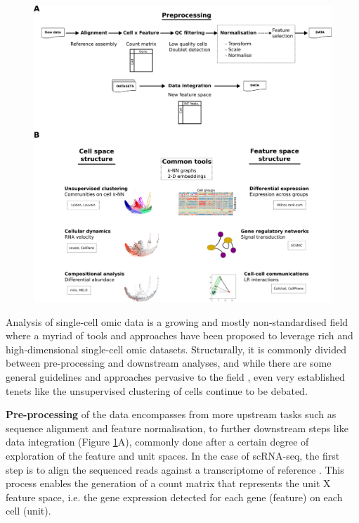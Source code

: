 \begin{figure}
    \centering
    \includegraphics{01intro/figs/1COMP_analysis.png}
    \caption{}
    \label{fig:1pipe}
\end{figure}

Analysis of single-cell omic data is a growing and mostly non-standardised field where a myriad of tools and approaches have been proposed to leverage rich and high-dimensional single-cell omic datasets. Structurally, it is commonly divided between pre-processing and downstream analyses, and while there are some general guidelines and approaches pervasive to the field \cite{luecken_current_2019, heumos_best_2023}, even very established tenets like the unsupervised clustering of cells continue to be debated.

\textbf{Pre-processing} of the data encompasses from more upstream tasks such as sequence alignment and feature normalisation, to further downstream steps like data integration (Figure \ref{fig:1pipe}A), commonly done after a certain degree of exploration of the feature and unit spaces. In the case of scRNA-seq, the first step is to align the sequenced reads against a transcriptome of reference \cite{dobin_star_2013,bray_near-optimal_2016}. This process enables the generation of a count matrix that represents the unit X feature space, i.e. the gene expression detected for each gene (feature) on each cell (unit).

